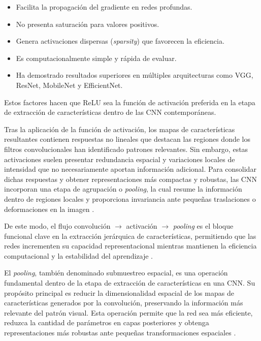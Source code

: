 	\begin{itemize}
		\item Facilita la propagación del gradiente en redes profundas.
		\item No presenta saturación para valores positivos.
		\item Genera activaciones dispersas (\textit{sparsity}) que favorecen la eficiencia.
		\item Es computacionalmente simple y rápida de evaluar.
		\item Ha demostrado resultados superiores en múltiples arquitecturas como VGG, ResNet, MobileNet y EfficientNet.
	\end{itemize}
	
	Estos factores hacen que ReLU sea la función de activación preferida en la etapa de extracción de características dentro de las CNN contemporáneas.
	
	Tras la aplicación de la función de activación, los mapas de características resultantes contienen respuestas no lineales que destacan las regiones donde los filtros convolucionales han identificado patrones relevantes. Sin embargo, estas activaciones suelen presentar redundancia espacial y variaciones locales de intensidad que no necesariamente aportan información adicional. Para consolidar dichas respuestas y obtener representaciones más compactas y robustas, las CNN incorporan una etapa de agrupación o \textit{pooling}, la cual resume la información dentro de regiones locales y proporciona invariancia ante pequeñas traslaciones o deformaciones en la imagen \cite{goodfellow2016dl}.
	
	De este modo, el flujo convolución $\rightarrow$ activación $\rightarrow$ \textit{pooling} es el  bloque funcional clave en la extracción jerárquica de características, permitiendo que las redes incrementen su capacidad representacional mientras mantienen la eficiencia computacional y la estabilidad del aprendizaje \cite{scherer2010}.
	
	El \textit{pooling}, también denominado submuestreo espacial, es una operación fundamental dentro de la etapa de extracción de características en una CNN. Su propósito principal es reducir la dimensionalidad espacial de los mapas de características generados por la convolución, preservando la información más relevante del patrón visual. Esta operación permite que la red sea más eficiente, reduzca la cantidad de parámetros en capas posteriores y obtenga representaciones más robustas ante pequeñas transformaciones espaciales \cite{goodfellow2016dl}.
	
